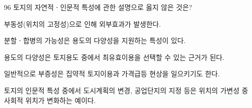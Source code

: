 \begin{question}{96}
토지의 자연적ㆍ인문적 특성에 관한 설명으로 옳지 않은 것은?
\begin{choices}
  \item 부동성(위치의 고정성)으로 인해 외부효과가 발생한다.
  \item 분할ㆍ합병의 가능성은 용도의 다양성을 지원하는 특성이 있다.
  \item 용도의 다양성은 토지용도 중에서 최유효이용을 선택할 수 있는 근거가 된다.
  \item 일반적으로 부증성은 집약적 토지이용과 가격급등 현상을 일으키기도 한다.
  \item 토지의 인문적 특성 중에서 도시계획의 변경, 공업단지의 지정 등은 위치의 가변성 중 사회적 위치가 변화하는 예이다.
\end{choices}
\end{question}

